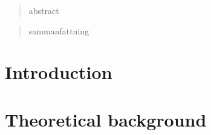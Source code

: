 \documentclass[a4paper, 12pt]{article}
\begin{document}
\begin{abstract}
    abstract
\end{abstract}

\bigskip

\bigskip

\bigskip

\bigskip

\begin{otherlanguage}{swedish}
\begin{abstract}
    sammanfattning
  
\end{abstract}
\end{otherlanguage}


\newpage
\tableofcontents
\newpage
{}

\section{Introduction}



\section{Theoretical background}







\newpage
%

\newpage




\appendix
\end{document}
